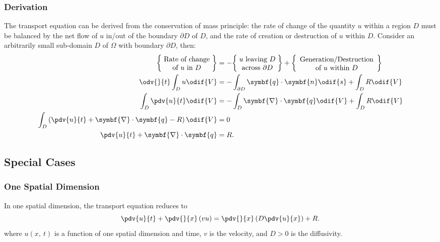 \documentclass{article}
\begin{document}
\subsubsection{Derivation}
The transport equation can be derived from the conservation of mass
principle: the rate of change of the quantity \(u\) within a region
\(D\) must be balanced by the net flow of \(u\) in/out of the boundary
\(\partial{D}\) of \(D\), and the rate of creation or destruction of
\(u\) within \(D\). Consider an arbitrarily small sub-domain \(D\) of
\(\Omega\) with boundary \(\partial D\), then:
\begin{align*}
    \biggl\{ \parbox[c]{2.5cm}{\centering Rate of change                                                                                                          \\ of \(u\) in \(D\)} \biggr\} & =
    -\biggl\{ \parbox[c]{2cm}{\centering \(u\) leaving \(D\)                                                                                                      \\ across \(\partial{D}\)} \biggr\}
    + \biggl\{ \parbox[c]{4cm}{\centering Generation/Destruction                                                                                                  \\of \(u\) within \(D\)} \biggr\} \\
    \odv{}{t} \int_D u \odif{V}                                                    & = -\int_{\partial{D}} \symbf{q} \cdot \symbf{n} \odif{s} + \int_D R \odif{V} \\
    \int_D \pdv{u}{t} \odif{V}                                                     & = -\int_{D} \symbf{\nabla} \cdot \symbf{q} \odif{V} + \int_D R \odif{V}      \\
    \int_D \left( \pdv{u}{t} + \symbf{\nabla} \cdot \symbf{q} - R \right) \odif{V} & = 0                                                                          \\
    \pdv{u}{t} + \symbf{\nabla} \cdot \symbf{q}                                    & = R.
\end{align*}
\subsection{Special Cases}
\subsubsection{One Spatial Dimension}
In one spatial dimension, the transport equation reduces to
\begin{equation*}
    \pdv{u}{t} + \pdv{}{x} \left( v u \right) = \pdv{}{x} \left( D \pdv{u}{x} \right) + R.
\end{equation*}
where \(u\left( x,\: t \right)\) is a function of one spatial dimension
and time, \(v\) is the velocity, and \(D > 0\) is the diffusivity.
\end{document}
